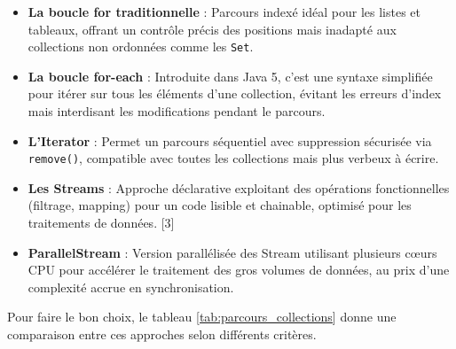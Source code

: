 \documentclass[12pt,a4paper]{report}
\begin{document}
	\begin{itemize}
		
		\item \textbf{La boucle for traditionnelle} : Parcours indexé idéal pour les listes et tableaux, offrant un contrôle précis des positions mais inadapté aux collections non ordonnées comme les \verb|Set|.
		
		\item \textbf{La boucle for-each} : Introduite dans Java 5, c'est une syntaxe simplifiée pour itérer sur tous les éléments d'une collection, évitant les erreurs d'index mais interdisant les modifications pendant le parcours.
		
		\item \textbf{L'Iterator} : Permet un parcours séquentiel avec suppression sécurisée via \verb|remove()|, compatible avec toutes les collections mais plus verbeux à écrire.
		
		\item \textbf{Les Streams} : Approche déclarative exploitant des opérations fonctionnelles (filtrage, mapping) pour un code lisible et chainable, optimisé pour les traitements de données. [3]
		
		\item \textbf{ParallelStream} : Version parallélisée des Stream utilisant plusieurs cœurs CPU pour accélérer le traitement des gros volumes de données, au prix d'une complexité accrue en synchronisation.
		
	\end{itemize}
	
	Pour faire le bon choix, le tableau \ref{tab:parcours_collections} donne une comparaison entre ces approches selon différents critères.
	
\end{document}
